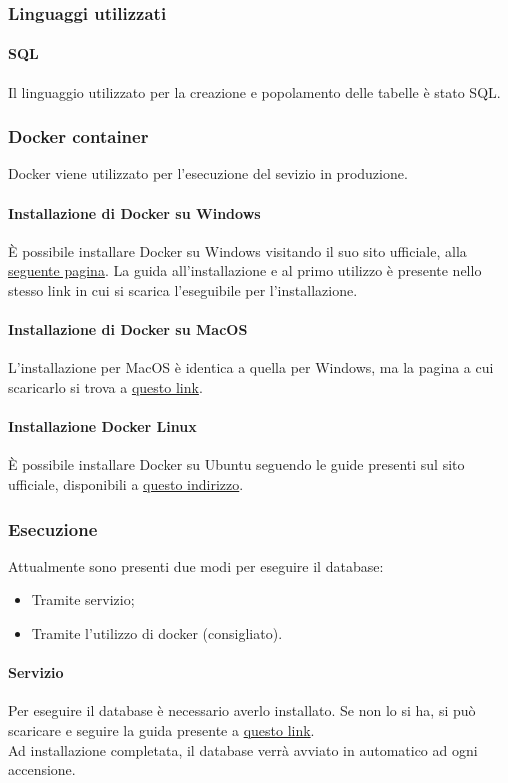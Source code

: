 \subsubsection{Linguaggi utilizzati}
\paragraph{SQL}
Il linguaggio utilizzato per la creazione e popolamento delle tabelle è stato SQL.

\subsubsection{Docker container}
Docker viene utilizzato per l'esecuzione del sevizio in produzione.
\paragraph{Installazione di Docker su Windows}
È possibile installare Docker su Windows visitando il suo sito ufficiale, alla \href{https://hub.docker.com/editions/community/docker-ce-desktop-windows}{seguente pagina}. La guida all'installazione e al primo utilizzo è presente nello stesso link in cui si scarica l'eseguibile per l'installazione.
\paragraph{Installazione di Docker su MacOS}
L'installazione per MacOS è identica a quella per Windows, ma la pagina a cui scaricarlo si trova a \href{https://hub.docker.com/editions/community/docker-ce-desktop-mac}{questo link}.
\paragraph{Installazione Docker Linux}
È possibile installare Docker su Ubuntu seguendo le guide presenti sul sito ufficiale, disponibili a \href{https://docs.docker.com/engine/install/ubuntu/}{questo indirizzo}.

\subsubsection{Esecuzione}
Attualmente sono presenti due modi per eseguire il database:
\begin{itemize}
	\item Tramite servizio;
	\item Tramite l'utilizzo di docker (consigliato).
\end{itemize}
\paragraph{Servizio}
Per eseguire il database è necessario averlo installato. Se non lo si ha, si può scaricare e seguire la guida presente a \href{https://mariadb.org/download/}{questo link}. \\
Ad installazione completata, il database verrà avviato in automatico ad ogni accensione.
